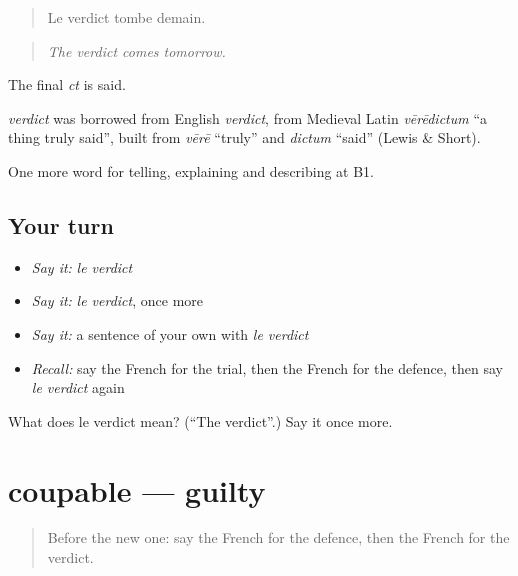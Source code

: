 \begin{quote}
Le verdict tombe demain.
\end{quote}

\begin{quote}
\emph{The verdict comes tomorrow.}
\end{quote}

The final \emph{ct} is said.

\begin{cousinweb}
\emph{verdict} was borrowed from English \emph{verdict}, from Medieval Latin \emph{vērēdictum} \textquotedblleft{}a thing truly said\textquotedblright{}, built from \emph{vērē} \textquotedblleft{}truly\textquotedblright{} and \emph{dictum} \textquotedblleft{}said\textquotedblright{} (Lewis \& Short).
\end{cousinweb}

\begin{grammarlens}[title={What you've built}]
One more word for telling, explaining and describing at B1.
\end{grammarlens}

\subsection*{Your turn}
\begin{itemize}
\raggedright
  \item \emph{Say it:} \emph{le verdict}
  \item \emph{Say it:} \emph{le verdict}, once more
  \item \emph{Say it:} a sentence of your own with \emph{le verdict}
  \item \emph{Recall:} say the French for the trial, then the French for the defence, then say \emph{le verdict} again
\end{itemize}

\begin{tcolorbox}[breakable,colback=teal!4,colframe=teal!35!black,title={Before you move on}]
What does le verdict mean? (\textquotedblleft{}The verdict\textquotedblright{}.) Say it once more.
\end{tcolorbox}
\section[coupable]{coupable — guilty}

\label{lesson:FR-C387-coupable}



\begin{quote}
Before the new one: say the French for the defence, then the French for the verdict.
\end{quote}

